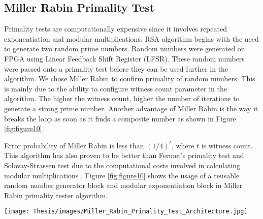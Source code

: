 \documentclass{cpp}
\begin{document}
\subsection{Miller Rabin Primality Test}
Primality tests are computationally expensive since it involves repeated exponentiation and modular multiplications. RSA algorithm begins with the need to generate two random prime numbers. Random numbers were generated on FPGA using Linear Feedback Shift Register (LFSR). These random numbers were passed onto a primality test before they can be used further in the algorithm. We chose Miller Rabin to confirm primality of random numbers. This is mainly due to the ability to configure witness count parameter in the algorithm. The higher the witness count, higher the number of iterations to generate a strong prime number. Another advantage of Miller Rabin is the way it breaks the loop as soon as it finds a composite number as shown in Figure \ref{fig:figure10}.

Error probability of Miller Rabin is less than $(1/4)^t$, where $t$ is witness count. This algorithm has also proven to be better than Fermet's primality test and Solovay-Strassen test due to the computational costs involved in calculating modular multiplications \cite{alfred:paul:scott}. Figure \ref{fig:figure10} shows the usage of a reusable random number generator block and modular exponentiation block in Miller Rabin primality tester algorithm.

\newpage
\begin{figure*}[htp]
    \centering
    \texttt{[image: Thesis/images/Miller\_Rabin\_Primality\_Test\_Architecture.jpg]}
    \caption{Architecture of Miller Rabin Primality Test}
    \label{fig:figure10}
\end{figure*}




\newpage
\end{document}
